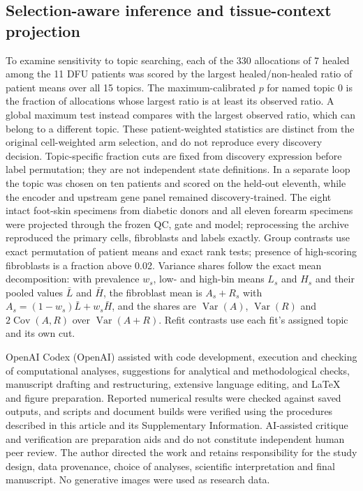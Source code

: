 \documentclass[10pt,a4paper]{article}
\begin{document}
\subsection{Selection-aware inference and tissue-context projection}
To examine sensitivity to topic searching, each of the 330 allocations of 7 healed among the 11 DFU patients was scored by the largest healed/non-healed ratio of patient means over all 15 topics. The maximum-calibrated $p$ for named topic 0 is the fraction of allocations whose largest ratio is at least its observed ratio. A global maximum test instead compares with the largest observed ratio, which can belong to a different topic. These patient-weighted statistics are distinct from the original cell-weighted arm selection, and do not reproduce every discovery decision. Topic-specific fraction cuts are fixed from discovery expression before label permutation; they are not independent state definitions. In a separate loop the topic was chosen on ten patients and scored on the held-out eleventh, while the encoder and upstream gene panel remained discovery-trained. The eight intact foot-skin specimens from diabetic donors and all eleven forearm specimens were projected through the frozen QC, gate and model; reprocessing the archive reproduced the primary cells, fibroblasts and labels exactly. Group contrasts use exact permutation of patient means and exact rank tests; presence of high-scoring fibroblasts is a fraction above 0.02. Variance shares follow the exact mean decomposition: with prevalence $w_s$, low- and high-bin means $L_s$ and $H_s$ and their pooled values $\bar L$ and $\bar H$, the fibroblast mean is $A_s+R_s$ with $A_s=(1-w_s)\bar L+w_s\bar H$, and the shares are $\operatorname{Var}(A)$, $\operatorname{Var}(R)$ and $2\operatorname{Cov}(A,R)$ over $\operatorname{Var}(A+R)$. Refit contrasts use each fit's assigned topic and its own cut.


OpenAI Codex (OpenAI) assisted with code development, execution and checking of computational analyses, suggestions for analytical and methodological checks, manuscript drafting and restructuring, extensive language editing, and LaTeX and figure preparation. Reported numerical results were checked against saved outputs, and scripts and document builds were verified using the procedures described in this article and its Supplementary Information. AI-assisted critique and verification are preparation aids and do not constitute independent human peer review. The author directed the work and retains responsibility for the study design, data provenance, choice of analyses, scientific interpretation and final manuscript. No generative images were used as research data.



\endgroup
\end{document}
